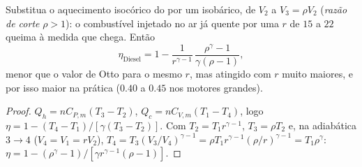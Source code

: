 \begin{proposition}\label{prop:b1:heat-engines:diesel}
Substitua o aquecimento isocórico do  por um isobárico, de
$V_2$ a $V_3 = \rho V_2$ (\emph{razão de corte} $\rho > 1$): o combustível
injetado no ar já quente por uma  $r$ de $15$ a $22$ queima
à medida que chega. Então
\[
\eta_{\text{Diesel}} = 1 - \frac{1}{r^{\gamma-1}}\,\frac{\rho^{\gamma} - 1}{\gamma(\rho - 1)} ,
\]
menor que o valor de Otto para o mesmo $r$, mas atingido com $r$ muito
maiores, e por isso maior na prática ($0.40$ a $0.45$ nos motores grandes).
\end{proposition}

\begin{proof}
$Q_h = nC_{P,m}(T_3 - T_2)$, $Q_c = nC_{V,m}(T_1 - T_4)$, logo $\eta = 1 -
(T_4 - T_1)/[\gamma(T_3 - T_2)]$. Com $T_2 = T_1r^{\gamma-1}$, $T_3 =
\rho T_2$ e, na adiabática $3 \to 4$ ($V_4 = V_1 = rV_2$), $T_4 =
T_3(V_3/V_4)^{\gamma-1} = \rho T_1 r^{\gamma-1}(\rho/r)^{\gamma-1} = T_1\rho^{\gamma}$:
$\eta = 1 - (\rho^\gamma - 1)/[\gamma r^{\gamma-1}(\rho - 1)]$.
\end{proof}

